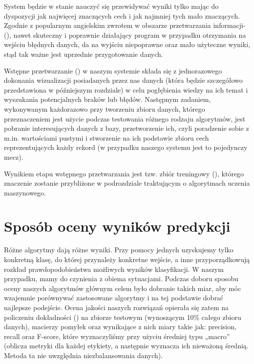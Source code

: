 System będzie w stanie nauczyć się przewidywać wyniki tylko mając do dyspozycji jak najwięcej znaczących cech i jak najmniej tych mało znaczących. Zgodnie z popularnym angielskim zwrotem w obszarze przetwarzania informacji-   (), nawet skuteczny i poprawnie działający program w przypadku otrzymania na wejściu błędnych danych, da na wyjściu niepoprawne oraz mało użyteczne wyniki, stąd tak ważne jest uprzednie przygotowanie danych.

Wstępne przetwarzanie () w naszym systemie składa się z jednorazowego dokonania wizualizacji posiadanych przez nas danych (która będzie szczegółowo przedstawiona w późniejszym rozdziale) w celu pogłębienia wiedzy na ich temat i wyszukania potencjalnych braków lub błędów. Następnym zadaniem, wykonywanym każdorazowo przy tworzeniu zbioru danych, którego przeznaczeniem jest użycie podczas testowania różnego rodzaju algorytmów, jest pobranie interesujących danych z bazy, przetworzenie ich, czyli poradzenie sobie z m.in. wartościami pustymi i stworzenie na ich podstawie zbioru cech reprezentujących każdy rekord (w przypadku naszego systemu jest to pojedynczy mecz). 

Wynikiem etapu wstępnego przetwarzania jest tzw. zbiór treningowy (), którego znaczenie zostanie przybliżone w podrozdziale traktującym o algorytmach uczenia maszynowego.

\section{Sposób oceny wyników predykcji}

Różne algorytmy dają różne wyniki. Przy pomocy jednych uzyskujemy tylko konkretną klasę, do której przynależy konkretne wejście, a inne przyporządkowują rozkład prawdopodobieństwa możliwych wyników klasyfikacji. W naszym przypadku, mamy do czynienia z obiema sytuacjami. Podczas doboru sposobu oceny naszych algorytmów głównym celem było dobranie takich miar, aby móc wzajemnie porównywać zastosowane algorytmy i na tej podstawie dobrać najlepsze podejście. Ocena jakości naszych rozwiązań opierała się zatem na policzeniu dokładności () na zbiorze testowym (wynoszącym 10\% całego zbioru danych), macierzy pomyłek oraz wynikające z nich miary takie jak: precision, recall oraz F-score, które wyznaczyliśmy przy użyciu średniej typu „macro” (oblicza metryki dla każdej etykiety, a następnie wyznacza ich nieważoną średnią. Metoda ta nie uwzględnia niezbalansowania danych).

